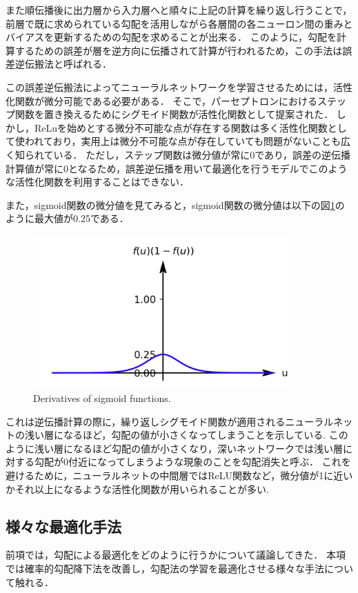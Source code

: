     また順伝播後に出力層から入力層へと順々に上記の計算を繰り返し行うことで，前層で既に求められている勾配を活用しながら各層間の各ニューロン間の重みとバイアスを更新するための勾配を求めることが出来る．
    このように，勾配を計算するための誤差が層を逆方向に伝播されて計算が行われるため，この手法は誤差逆伝搬法と呼ばれる．

    この誤差逆伝搬法によってニューラルネットワークを学習させるためには，活性化関数が微分可能である必要がある．
    そこで，パーセプトロンにおけるステップ関数を置き換えるためにシグモイド関数が活性化関数として提案された\cite{rumelhart1986learning}．
    しかし，ReLuを始めとする微分不可能な点が存在する関数は多く活性化関数として使われており，実用上は微分不可能な点が存在していても問題がないことも広く知られている．
    ただし，ステップ関数は微分値が常に0であり，誤差の逆伝播計算値が常に0となるため，誤差逆伝播を用いて最適化を行うモデルでこのような活性化関数を利用することはできない．

    また，sigmoid関数の微分値を見てみると，sigmoid関数の微分値は以下の図\ref{sigmoid_diff}のように最大値が0.25である．
    \begin{figure}[ht]
        \begin{center}
            \includegraphics[width=10cm]{./8_appendix/img/sigmoid_diff.png}
            \caption{Derivatives of sigmoid functions.}
            \label{sigmoid_diff}
        \end{center}
    \end{figure}
    これは逆伝播計算の際に，繰り返しシグモイド関数が適用されるニューラルネットの浅い層になるほど，勾配の値が小さくなってしまうことを示している.
    このように浅い層になるほど勾配の値が小さくなり，深いネットワークでは浅い層に対する勾配が0付近になってしまうような現象のことを勾配消失と呼ぶ．
    これを避けるために，ニューラルネットの中間層ではReLU関数など，微分値が1に近いかそれ以上になるような活性化関数が用いられることが多い.

\subsection{様々な最適化手法}
    前項では，勾配による最適化をどのように行うかについて議論してきた．
    本項では確率的勾配降下法を改善し，勾配法の学習を最適化させる様々な手法について触れる．
    
